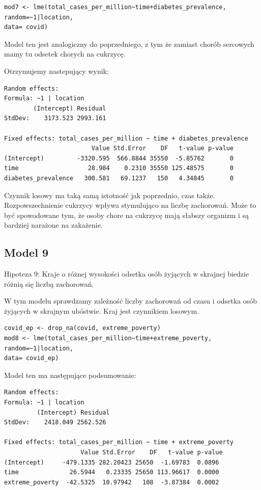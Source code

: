 \documentclass[12pt]{mwbk}
\theoremstyle{plain}
\theoremstyle{definition}
\theoremstyle{remark}
\begin{document}
\begin{verbatim}
mod7 <- lme(total_cases_per_million~time+diabetes_prevalence,
random=~1|location,
data= covid)
\end{verbatim}

Model ten jest analogiczny do poprzedniego, z tym że zamiast chorób sercowych mamy tu odsetek chorych na cukrzycę.

Otrzymujemy nastepujący wynik:
\begin{verbatim}
Random effects:
Formula: ~1 | location
        (Intercept) Residual
StdDev:    3173.523 2993.161

Fixed effects: total_cases_per_million ~ time + diabetes_prevalence 
                        Value Std.Error    DF   t-value p-value
(Intercept)         -3320.595  566.8844 35550  -5.85762       0
time                   28.984    0.2310 35550 125.48575       0
diabetes_prevalence   300.581   69.1237   150   4.34845       0
\end{verbatim}

Czynnik losowy ma taką samą istotność jak poprzednio, czas także. Rozpowszechnienie cukrzycy wpływa stymulująco na liczbę zachorowań. Może to być spowodowane tym, że osoby chore na cukrzycę mają słabszy organizm i są bardziej narażone na zakażenie.
\subsection{Model 9}

Hipoteza 9: Kraje o różnej wysokości odsetka osób żyjących w skrajnej biedzie różnią się liczbą zachorowań.

W tym modelu sprawdzamy zależność liczby zachorowań od czasu i odsetka osób żyjących w skrajnym ubóstwie. Kraj jest czynnikiem losowym.

\begin{verbatim}
covid_ep <- drop_na(covid, extreme_poverty)
mod8 <- lme(total_cases_per_million~time+extreme_poverty,
random=~1|location,
data= covid_ep)
\end{verbatim}

Model ten ma następujące podsumowanie:
\begin{verbatim}
Random effects:
Formula: ~1 | location
         (Intercept) Residual
StdDev:    2418.049 2562.526

Fixed effects: total_cases_per_million ~ time + extreme_poverty 
                     Value Std.Error    DF   t-value p-value
(Intercept)     -479.1335 282.20423 25650  -1.69783  0.0896
time              26.5944   0.23335 25650 113.96617  0.0000
extreme_poverty  -42.5325  10.97942   108  -3.87384  0.0002
\end{verbatim}
\end{document}
